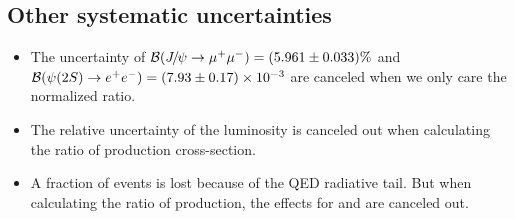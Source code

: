 \subsection{Other systematic uncertainties}
\begin{itemize}
\item The uncertainty of ${\mathcal{B}}({{J\mskip -3mu/\mskip -2mu\psi}}\rightarrow\mu^+\mu^-)=(5.961\pm0.033)\%$ and  ${\mathcal{B}}({\psi{(2S)}}\rightarrow e^+e^-)=(7.93\pm0.17)\times10^{-3}$ are canceled when we only care the normalized ratio.
\item The relative uncertainty of the luminosity is canceled out when calculating the ratio of production cross-section.
\item A fraction of events is lost because of the QED radiative tail. But when calculating the ratio of production, the effects for \jpsi and \psitwos are canceled out.
\end{itemize}

